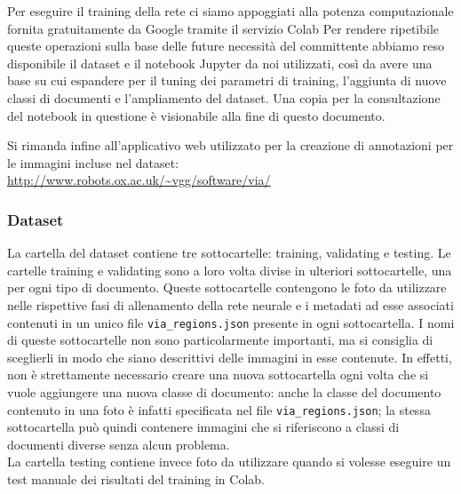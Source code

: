 \documentclass[12pt,a4paper]{article}
\begin{document}
Per eseguire il training della rete ci siamo appoggiati alla potenza
computazionale fornita gratuitamente da Google tramite il servizio Colab
Per rendere ripetibile queste operazioni sulla base delle future
necessità del committente abbiamo reso disponibile il dataset e il
notebook Jupyter da noi utilizzati, così da avere una base su cui
espandere per il tuning dei parametri di training, l'aggiunta di nuove
classi di documenti e l'ampliamento del dataset. Una copia per la
consultazione del notebook in questione è visionabile alla fine di
questo documento.

Si rimanda infine all'applicativo web utilizzato per la
creazione di annotazioni per le immagini incluse nel dataset:\\
\url{http://www.robots.ox.ac.uk/~vgg/software/via/}

\subsubsection{Dataset}

La cartella del dataset contiene tre sottocartelle: training, validating
e testing. Le cartelle training e validating sono a loro volta divise in
ulteriori sottocartelle, una per ogni tipo di documento. Queste
sottocartelle contengono le foto da utilizzare nelle rispettive fasi di
allenamento della rete neurale e i metadati ad esse associati contenuti
in un unico file \texttt{via\_regions.json} presente in ogni
sottocartella. I nomi di queste sottocartelle non sono particolarmente
importanti, ma si consiglia di sceglierli in modo che siano descrittivi
delle immagini in esse contenute. In effetti, non è strettamente
necessario creare una nuova sottocartella ogni volta che si vuole
aggiungere una nuova classe di documento: anche la classe del documento
contenuto in una foto è infatti specificata nel file
\texttt{via\_regions.json}; la stessa sottocartella può quindi contenere
immagini che si riferiscono a classi di documenti diverse senza alcun
problema.\\ La cartella testing contiene invece foto da utilizzare
quando si volesse eseguire un test manuale dei risultati del training in
Colab.
\end{document}

